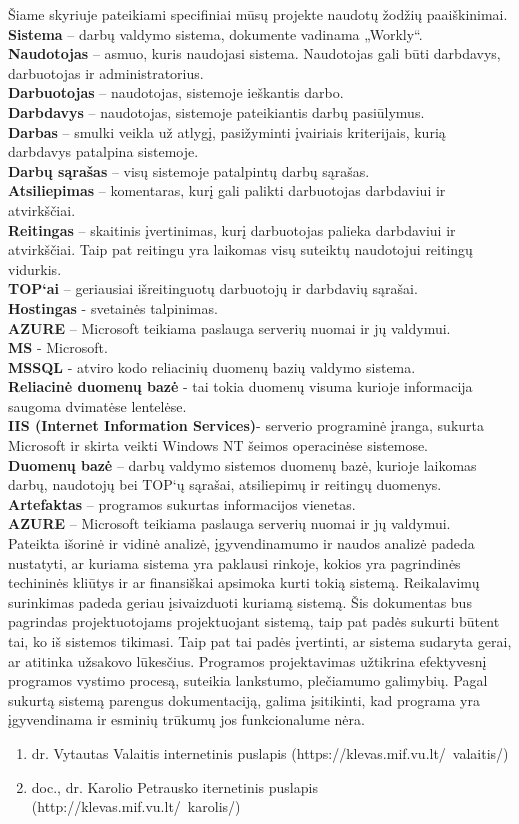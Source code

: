 \documentclass{VUMIFPSkursinis}
\begin{document}
Šiame skyriuje pateikiami specifiniai mūsų projekte naudotų žodžių paaiškinimai.\\
\textbf{Sistema} – darbų valdymo sistema, dokumente vadinama „Workly“. \\
\textbf{Naudotojas} – asmuo, kuris naudojasi sistema. Naudotojas gali būti darbdavys, darbuotojas ir administratorius.\\
\textbf{Darbuotojas} – naudotojas, sistemoje ieškantis darbo.\\
\textbf{Darbdavys} – naudotojas, sistemoje pateikiantis darbų pasiūlymus.\\
\textbf{Darbas} – smulki veikla už atlygį, pasižyminti įvairiais kriterijais,  kurią darbdavys patalpina sistemoje. \\
\textbf{Darbų sąrašas} – visų sistemoje patalpintų darbų sąrašas.\\
\textbf{Atsiliepimas} – komentaras, kurį gali palikti darbuotojas darbdaviui ir atvirkščiai.\\
\textbf{Reitingas} – skaitinis įvertinimas, kurį darbuotojas palieka darbdaviui ir atvirkščiai. Taip pat reitingu yra laikomas  visų suteiktų naudotojui reitingų vidurkis.\\
\textbf{TOP‘ai} – geriausiai išreitinguotų darbuotojų ir darbdavių sąrašai. \\
\textbf{Hostingas} - svetainės talpinimas.\\
\textbf{AZURE} – Microsoft teikiama paslauga serverių nuomai ir jų valdymui.\\
\textbf{MS} - Microsoft.\\
\textbf{MSSQL} - atviro kodo reliacinių duomenų bazių valdymo sistema.\\
\textbf{Reliacinė duomenų bazė} - tai tokia duomenų visuma kurioje informacija saugoma dvimatėse lentelėse.\\
\textbf{IIS (Internet Information Services)}- serverio programinė įranga, sukurta Microsoft ir skirta veikti Windows NT šeimos operacinėse sistemose.\\
\textbf{Duomenų bazė} – darbų valdymo sistemos duomenų bazė, kurioje laikomas darbų, naudotojų bei TOP‘ų sąrašai, atsiliepimų ir reitingų duomenys.\\
\textbf{Artefaktas} – programos sukurtas informacijos vienetas.\\
\textbf{AZURE} – Microsoft teikiama paslauga serverių nuomai ir jų valdymui.\\
Pateikta išorinė ir vidinė analizė, įgyvendinamumo ir naudos analizė padeda nustatyti, ar kuriama sistema yra paklausi rinkoje, kokios yra pagrindinės techininės kliūtys ir ar finansiškai apsimoka kurti tokią sistemą. Reikalavimų surinkimas padeda geriau įsivaizduoti kuriamą sistemą. Šis dokumentas bus pagrindas projektuotojams projektuojant sistemą, taip pat padės sukurti būtent tai, ko iš sistemos tikimasi. Taip pat tai padės įvertinti, ar sistema sudaryta gerai, ar atitinka užsakovo lūkesčius. Programos projektavimas užtikrina efektyvesnį programos vystimo procesą, suteikia lankstumo, plečiamumo galimybių. Pagal sukurtą sistemą parengus dokumentaciją, galima įsitikinti, kad programa yra įgyvendinama ir esminių trūkumų jos funkcionalume nėra.
\begin{enumerate}
	\item  dr. Vytautas Valaitis internetinis puslapis (https://klevas.mif.vu.lt/~valaitis/)
	\item doc., dr. Karolio Petrausko iternetinis puslapis (http://klevas.mif.vu.lt/~karolis/)
\end{enumerate}
\end{document}
